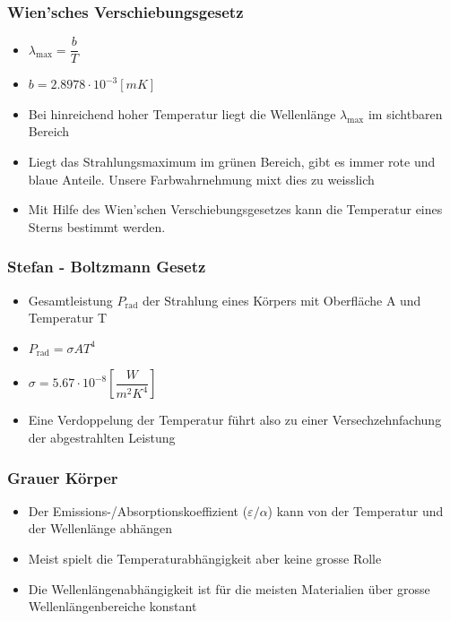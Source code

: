 \documentclass[8pt,a4paper]{scrartcl}
\begin{document}
\begin{multicols*}{3}
\begin{itemize}
							\end{itemize}	
					
						\subsubsection{Wien’sches Verschiebungsgesetz}
							\begin{itemize}\itemsep0pt
								\item $\lambda_{\text{max}}=\dfrac{b}{T}$
								\item $b = 2.8978 \cdot 10^{-3} [mK]$
								\item Bei hinreichend hoher Temperatur liegt die Wellenlänge $\lambda_{\text{max}}$ im sichtbaren Bereich
								\item Liegt das Strahlungsmaximum im grünen Bereich, gibt es immer rote und blaue Anteile. Unsere Farbwahrnehmung mixt dies zu weisslich
								\item Mit Hilfe des Wien’schen Verschiebungsgesetzes kann die Temperatur eines Sterns bestimmt werden.
							\end{itemize}	
						
						\subsubsection{Stefan - Boltzmann Gesetz}
							\begin{itemize}\itemsep0pt
								\item Gesamtleistung $P_{\text{rad}}$ der Strahlung eines Körpers mit Oberfläche A und Temperatur T
								\item $P_{\text{rad}} = \sigma AT^{4}$
								\item $\sigma = 5.67\cdot 10^{-8} [\dfrac{W}{m^{2}K^{4}}]$
								\item Eine Verdoppelung der Temperatur führt also zu einer Versechzehnfachung der abgestrahlten Leistung
							\end{itemize}	

						\subsubsection{Grauer Körper}
							\begin{itemize}\itemsep0pt
								
								\item Der Emissions-/Absorptionskoeffizient ($\varepsilon/\alpha$) kann von der Temperatur und der Wellenlänge abhängen
								\item Meist spielt die Temperaturabhängigkeit aber keine grosse Rolle
								\item Die Wellenlängenabhängigkeit ist für die meisten Materialien über grosse Wellenlängenbereiche konstant	
							\end{itemize}	
							

\end{multicols*}
\end{document}
